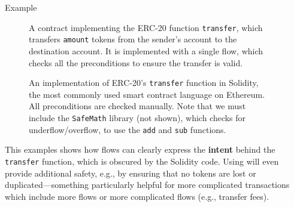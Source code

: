\documentclass[usenames, dvipsnames, final]{beamer}
\newlength{\sepwidth}
\newlength{\colwidth}
\newcommand{\separatorcolumn}{\begin{column}{\sepwidth}\end{column}}
\begin{document}
\begin{frame}[t]
\begin{columns}[t]
\begin{column}{\colwidth}

  \begin{block}{Example}
    \begin{figure}[h]
        \centering
        
        \caption{A \langName contract implementing the ERC-20 function \lstinline{transfer}, which transfers \lstinline{amount} tokens from the sender's account to the destination account.
            It is implemented with a single flow, which checks all the preconditions to ensure the transfer is valid.}
        \label{fig:erc20-transfer-flow}
    \end{figure}
    \begin{figure}[h]
        \centering
        
        \caption{An implementation of ERC-20's \lstinline{transfer} function in Solidity, the most commonly used smart contract language on Ethereum.
            All preconditions are checked manually.
            Note that we must include the \lstinline{SafeMath} library (not shown), which checks for underflow/overflow, to use the \lstinline{add} and \lstinline{sub} functions.}
        \label{fig:erc20-transfer-sol}
    \end{figure}

      This examples shows how flows can clearly express the \textbf{intent} behind the \lstinline{transfer} function, which is obscured by the Solidity code.
      Using \langName will even provide additional safety, e.g., by ensuring that no tokens are lost or duplicated---something particularly helpful for more complicated transactions which include more flows or more complicated flows (e.g., transfer fees).
  \end{block}
\end{column}

\separatorcolumn


\end{columns}
\end{frame}
\end{document}
